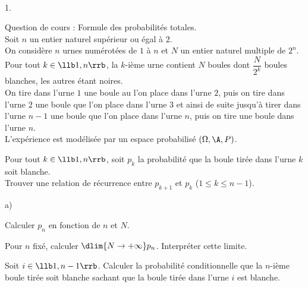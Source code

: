 \begin{exerciceAP}~
  \begin{noliste}{1.}
    \setlength{\itemsep}{2mm}
  \item Question de cours : Formule des probabilités totales.\\
    Soit $n$ un entier naturel supérieur ou égal à $2$.\\
    On considère $n$ urnes numérotées de $1$ à $n$ et $N$ un entier
    naturel multiple de $2^n$.\\
    Pour tout $k\in\llb 1,n\rrb$, la $k$-ième urne contient $N$ boules
    dont $\dfrac{N}{2^k}$ boules blanches, les autres étant noires.\\
    On tire dans l'urne $1$ une boule au l'on place dans l'urne $2$,
    puis on tire dans l'urne $2$ une boule que l'on place dans l'urne
    $3$ et ainsi de suite jusqu'à tirer dans l'urne $n-1$ une boule
    que l'on place dans l'urne $n$, puis on tire une boule dans l'urne
    $n$.\\
    L'expérience est modélisée par un espace probabilisé
    $(\Omega,\A,P)$.
  \item Pour tout $k\in\llb 1,n\rrb$, soit $p_k$ la probabilité que la
    boule tirée dans l'urne $k$ soit blanche.\\
    Trouver une relation de récurrence entre $p_{k+1}$ et $p_k$
    ($1\leq k\leq n-1$).
  \item 
    \begin{noliste}{a)}
    \setlength{\itemsep}{2mm}
    \item Calculer $p_n$ en fonction de $n$ et $N$.
    \item Pour $n$ fixé, calculer $\dlim{N\to+\infty}
      p_n$. Interpréter cette limite.
    \end{noliste}
  \item Soit $i\in\llb 1,n-1\rrb$. Calculer la probabilité
    conditionnelle que la $n$-ième boule tirée soit blanche sachant
    que la boule tirée dans l'urne $i$ est blanche.
  \end{noliste}
\end{exerciceAP} 



